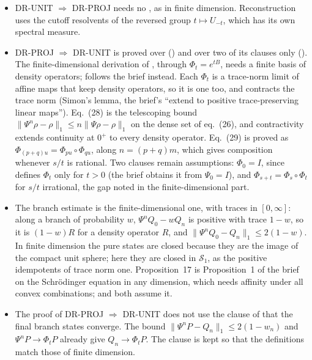 \documentclass[11pt]{article}
\begin{document}
\begin{itemize}
  (). Then $\rho H\psi = \rho K_m\psi$ by symmetry of $H$.
\item DR-UNIT $\Rightarrow$ DR-PROJ needs no , as in finite dimension.
  Reconstruction uses the cutoff resolvents of the reversed group $t \mapsto U_{-t}$, which has its
  own spectral measure.
\item DR-PROJ $\Rightarrow$ DR-UNIT is proved over  () and
  over two of its clauses only (). The
  finite-dimensional derivation of , through $\Phi_t = e^{tB}$, needs a finite
  basis of density operators;  follows the brief instead.
  Each $\Phi_t$ is a trace-norm limit of affine maps that keep density operators, so it is one
  too, and contracts the trace norm (Simon's lemma, the brief's ``extend to positive
  trace-preserving linear maps''). Eq.~(28) is the telescoping bound
  $\|\Psi^n\rho - \rho\|_1 \le n\|\Psi\rho - \rho\|_1$ on the dense set of eq.~(26), and
  contractivity extends continuity at $0^+$ to every density operator. Eq.~(29) is proved as
  $\Phi_{(p+q)u} = \Phi_{pu}\circ\Phi_{qu}$, along $n = (p+q)m$, which gives composition whenever
  $s/t$ is rational. Two clauses remain assumptions: $\Phi_0 = I$, since 
  defines $\Phi_t$ only for $t > 0$ (the brief obtains it from $\Psi_0 = I$), and
  $\Phi_{s+t} = \Phi_s\circ\Phi_t$ for $s/t$ irrational, the gap noted in the finite-dimensional
  part.
\item The branch estimate is the finite-dimensional one, with traces in $[0,\infty]$: along a
  branch of probability $w$,
  $\Psi^nQ_0 - wQ_n$ is positive with trace $1 - w$, so it is $(1-w)R$ for a density operator $R$,
  and $\|\Psi^nQ_0 - Q_n\|_1 \le 2(1-w)$. In finite dimension the pure states are closed because
  they are the image of the compact unit sphere; here they are closed in $\mathcal{S}_1$, as the
  positive idempotents of trace norm one. Proposition~17 is Proposition~1 of the brief on the
  Schr\"odinger equation in any dimension, which needs affinity under all convex combinations;
   and  both assume it.
\item The proof of DR-PROJ $\Rightarrow$ DR-UNIT does not use the clause of
   that the final branch states converge. The bound
  $\|\Psi^nP - Q_n\|_1 \le 2(1-w_n)$ and $\Psi^nP \to \Phi_tP$ already give $Q_n \to \Phi_tP$.
  The clause is kept so that the definitions match those of finite dimension.

\end{itemize}
\end{document}
